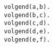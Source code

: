 \begin{verbatim}
volgend(a,b).
volgend(b,c).
volgend(c,d).
volgend(d,e).
volgend(e,f).
\end{verbatim}
